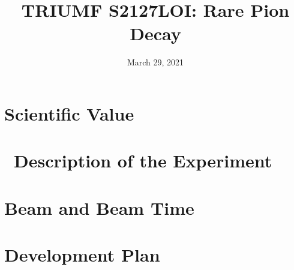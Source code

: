 \pagestyle{plain}



\setcounter{expnum}{2127}

\title{TRIUMF S2127LOI: Rare Pion Decay }

\date{March 29, 2021}





\maketitle

%

\section{Scientific Value}




\section{\nexp\ Description of the Experiment}\label{s:PIENUXEdet}



\section{Beam and Beam Time}


\newpage
\section{Development Plan}


%




\printbibliography

